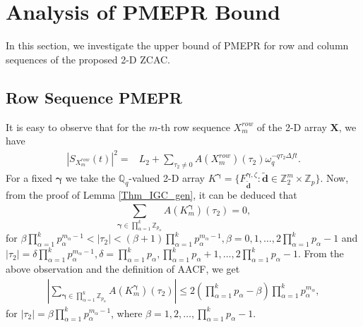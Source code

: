 \documentclass[pdflatex,sn-mathphys-num]{sn-jnl}%
\theoremstyle{thmstyleone}
\begin{document}
	
	
	\section{Analysis of PMEPR Bound}\label{sec4}
	In this section, we investigate the upper bound of PMEPR for row and column sequences of the proposed 2-D ZCAC.
	
	\subsection{Row Sequence PMEPR}
	It is easy to observe that for the $m$-th row sequence $X_m^{row}$ of the 2-D array $\mathbf{X}$, we have
	\begin{equation}\label{eqn_row_PAPR}
		\begin{split}
			\left| S_{X_m^{row}} (t) \right|^2 =& L_2 + \sum_{\tau_2 \neq 0}^{} A(X_m^{row}) (\tau_2) \omega_q^{- q \tau_2 \Delta f t}.
		\end{split}
	\end{equation}
	For a fixed $\bm{\gamma}$ we take the $\mathbb{Q}_q$-valued 2-D array $K^{\bm{\gamma}}  = \{ F_{\tilde{\mathbf{d}}}^{\bm{\gamma}, \zeta} : \tilde{\mathbf{d}} \in \mathbb{Z}_2^{m} \times \mathbb{Z}_p\}$. 
	Now, from the proof of Lemma \ref{Thm_IGC_gen}, it can be deduced that
	\begin{equation}
		\sum_{\bm{\gamma} \in \prod_{\alpha=1}^{k} \mathbb{Z}_{p_\alpha}}^{}  A(K^{\bm{\gamma}}_m) (\tau_2)=0,
	\end{equation}
	for  $\beta \prod_{\alpha=1}^{k} p_{\alpha}^{m_\alpha-1} < \left| \tau_2 \right|
	< (\beta +1) \prod_{\alpha=1}^{k} p_{\alpha}^{m_\alpha-1},
	\beta= 0,1, \dots, 2\prod_{\alpha=1}^{k} p_\alpha -1$  and $\left|\tau_2 \right| = \delta \prod_{\alpha=1}^{k} p_{\alpha}^{m_\alpha-1},  \delta= \prod_{\alpha=1}^{k} p_\alpha, \prod_{\alpha=1}^{k} p_\alpha +1, \dots,2 \prod_{\alpha=1}^{k} p_\alpha-1$.
	From the above observation and the definition of AACF, we get
	\begin{equation}
		\begin{split}
			\left| \sum_{\bm{\gamma} \in \prod_{\alpha=1}^{k} \mathbb{Z}_{p_\alpha}}^{}    A(K^{\bm{\gamma}}_m) (\tau_2) \right| \leq  2 \left( \prod_{\alpha=1}^{k} p_{\alpha}- \beta \right) \prod_{\alpha=1}^{k} p_{\alpha}^{m_\alpha},
		\end{split}
	\end{equation}
	for $\left| \tau_2 \right| = \beta \prod_{\alpha=1}^{k} p_\alpha^{m_\alpha-1}$, where $\beta= 1, 2, \dots, \prod_{\alpha=1}^{k} p_\alpha-1$.
\end{document}
